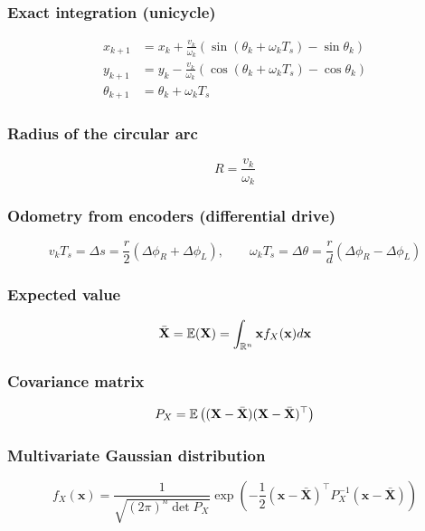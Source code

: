 \subsubsection{Exact integration (unicycle)}
\begin{align*}
    x_{k+1}&=x_k+\frac{v_k}{\omega_k}\left(\sin(\theta_k+\omega_kT_s)-\sin\theta_k\right)\\
    y_{k+1}&=y_k-\frac{v_k}{\omega_k}\left(\cos(\theta_k+\omega_kT_s)-\cos\theta_k\right)\\
    \theta_{k+1}&=\theta_k+\omega_kT_s
\end{align*}

\subsubsection{Radius of the circular arc}
\begin{equation*}
    R=\frac{v_k}{\omega_k}
\end{equation*}

\subsubsection{Odometry from encoders (differential drive)}
\begin{equation*}
    v_kT_s=\Delta s=\frac{r}{2}(\Delta\phi_R+\Delta\phi_L),\qquad\omega_kT_s=\Delta\theta=\frac{r}{d}(\Delta\phi_R-\Delta\phi_L)
\end{equation*}

\subsubsection{Expected value}
\begin{equation*}
    \bar{\mathbf X}={\mathbb E}(\mathbf X)=\int_{{\mathbb R}^n}\mathbf x f_X(\mathbf x)d\mathbf x
\end{equation*}

\subsubsection{Covariance matrix}
\begin{equation*}
    P_X={\mathbb E}\left((\mathbf X-\bar{\mathbf X})(\mathbf X-\bar{\mathbf X})^\top\right)
\end{equation*}

\subsubsection{Multivariate Gaussian distribution}
\begin{equation*}
    f_X(\mathbf x)=\frac{1}{\sqrt{(2\pi)^n\det P_X}}\exp\left(-\frac{1}{2}(\mathbf x-\bar{\mathbf X})^\top P_X^{-1}(\mathbf x-\bar{\mathbf X})\right)
\end{equation*}

